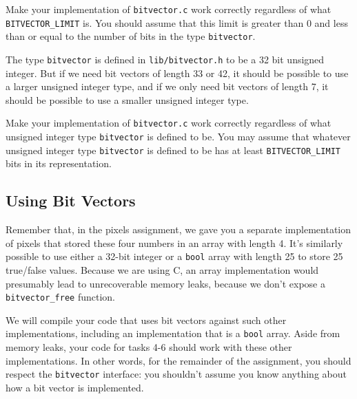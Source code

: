 \documentclass[12pt]{exam}
\begin{document}
\begin{task}[1]
  Make your implementation of \lstinline'bitvector.c' work correctly
  regardless of what \lstinline'BITVECTOR_LIMIT' is. You should assume
  that this limit is greater than 0 and less than or equal to the
  number of bits in the type \lstinline'bitvector'.
\end{task}

\bigskip The type \lstinline'bitvector' is defined in
\lstinline'lib/bitvector.h' to be a 32 bit unsigned integer. But if we
need bit vectors of length 33 or 42, it should be possible to use a
larger unsigned integer type, and if we only need bit vectors of
length 7, it should be possible to use a smaller unsigned integer
type.

\begin{task}[2]
  Make your implementation of \lstinline'bitvector.c' work correctly
  regardless of what unsigned integer type \lstinline'bitvector' is
  defined to be. You may assume that whatever unsigned integer type
  \lstinline'bitvector' is defined to be has at least
  \lstinline'BITVECTOR_LIMIT' bits in its representation.
\end{task}

\subsection*{Using Bit Vectors}

Remember that, in the pixels assignment, we gave you a separate
implementation of pixels that stored these four numbers in an array
with length 4.  It's similarly possible to use either a 32-bit integer
or a \lstinline'bool' array with length 25 to store 25 true/false
values. Because we are using C, an array implementation would
presumably lead to unrecoverable memory leaks, because we don't expose
a \lstinline'bitvector_free' function.

We will compile your code that uses bit vectors against such other
implementations, including an implementation that is a
\lstinline'bool' array.  Aside from memory leaks, your code for tasks
4-6 should work with these other implementations. In other words, for
the remainder of the assignment, you should respect the
\lstinline'bitvector' interface: you shouldn't assume you know
anything about how a bit vector is implemented.
\end{document}
